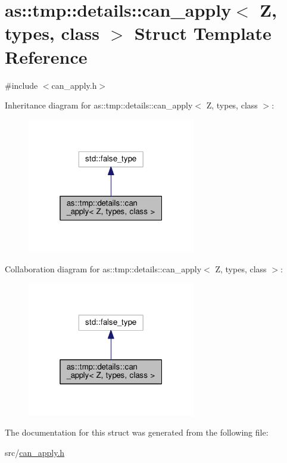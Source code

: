 \hypertarget{structas_1_1tmp_1_1details_1_1can__apply}{}\section{as\+:\+:tmp\+:\+:details\+:\+:can\+\_\+apply$<$ Z, types, class $>$ Struct Template Reference}
\label{structas_1_1tmp_1_1details_1_1can__apply}


{\ttfamily \#include $<$can\+\_\+apply.\+h$>$}



Inheritance diagram for as\+:\+:tmp\+:\+:details\+:\+:can\+\_\+apply$<$ Z, types, class $>$\+:
\nopagebreak
\begin{figure}[H]
\begin{center}
\leavevmode
\includegraphics[width=208pt]{structas_1_1tmp_1_1details_1_1can__apply__inherit__graph}
\end{center}
\end{figure}


Collaboration diagram for as\+:\+:tmp\+:\+:details\+:\+:can\+\_\+apply$<$ Z, types, class $>$\+:
\nopagebreak
\begin{figure}[H]
\begin{center}
\leavevmode
\includegraphics[width=208pt]{structas_1_1tmp_1_1details_1_1can__apply__coll__graph}
\end{center}
\end{figure}


The documentation for this struct was generated from the following file\+:\begin{DoxyCompactItemize}
\item 
src/\hyperlink{can__apply_8h}{can\+\_\+apply.\+h}\end{DoxyCompactItemize}
